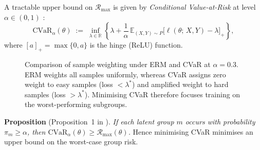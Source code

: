 A tractable upper bound on $\mathcal{R}_{\max}$ is given by
\emph{Conditional Value-at-Risk} at level $\alpha \in (0,1)$
\cite{rockafellar2000}:
\begin{equation}
  \mathrm{CVaR}_{\alpha}(\theta)
  \;:=\; \inf_{\lambda \in \mathbb{R}}
         \left\{
           \lambda
           + \frac{1}{\alpha}\,
           \mathbb{E}_{(X,Y)\sim P}\!
           \bigl[\ell(\theta;\,X,Y) - \lambda\bigr]_{+}
         \right\},
  \label{eq:cvar1}
\end{equation}
where $[a]_{+} = \max\{0,a\}$ is the hinge (ReLU) function.
\begin{figure}[!htbp]
  \centering
  \caption{Comparison of sample weighting under ERM and CVaR at
           $\alpha = 0.3$.  ERM weights all samples uniformly,
           whereas CVaR assigns zero weight to easy samples
           (loss $< \lambda^*$) and amplified weight to hard
           samples (loss $> \lambda^*$).  Minimising CVaR therefore
           focuses training on the worst-performing subgroups.}
  \label{fig:cvar_weighting}
\end{figure}

\noindent
\textbf{Proposition} (Proposition~1 in \cite{ju2024}).
\emph{If each latent group $m$ occurs with probability
$\pi_m \geq \alpha$, then
$\mathrm{CVaR}_\alpha(\theta) \geq \mathcal{R}_{\max}(\theta)$.}
Hence minimising CVaR minimises an upper bound on the worst-case
group risk.

